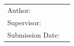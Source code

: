 \begin{titlepage}
  \centering


  \vspace{5mm}
  {\large\MakeUppercase{\getUniversity{}}}\\

  \vspace{10mm}
  {\large\MakeUppercase{\getFaculty{}}}\\
  \vspace{3mm}



  \vspace{20mm}
  {\Large \getDoctype{}}

  \makeatletter
  \vspace{15mm}
  {



  \vspace{10mm}
  {\huge\bfseries \foreignlanguage{english}{\getTitle{}}}
  }
  \makeatother

 \vspace{15mm}
  \begin{tabular}{l l}
    Author:          & \getAuthor{} \\
    Supervisor:         & \getSupervisor{} \\
    Submission Date: & \getSubmissionDate{} \\
  \end{tabular}

\end{titlepage}
